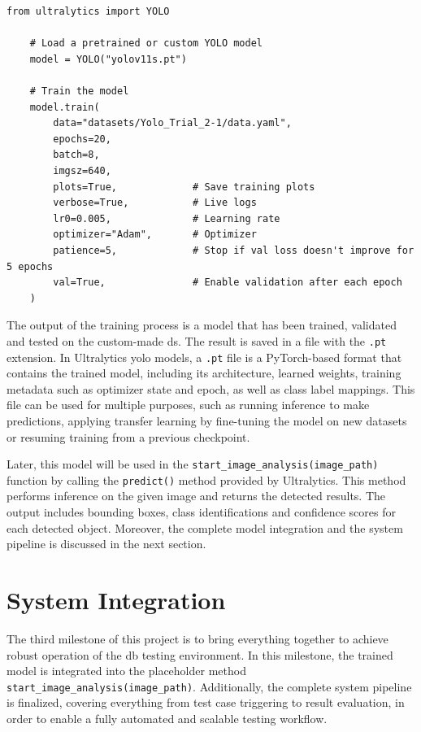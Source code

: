 \begin{lstlisting}[caption={Y\gls{yolo}v11 training code snippet}, label={lst:yolo_train}]
    from ultralytics import YOLO
    
    # Load a pretrained or custom YOLO model
    model = YOLO("yolov11s.pt") 
    
    # Train the model
    model.train(
        data="datasets/Yolo_Trial_2-1/data.yaml",
        epochs=20,
        batch=8,
        imgsz=640,
        plots=True,             # Save training plots
        verbose=True,           # Live logs
        lr0=0.005,              # Learning rate
        optimizer="Adam",       # Optimizer
        patience=5,             # Stop if val loss doesn't improve for 5 epochs
        val=True,               # Enable validation after each epoch
    )
\end{lstlisting}

The output of the training process is a model that has been trained, validated and tested on the custom-made \gls{ds}. The result is saved in a file with the \texttt{.pt} extension. In Ultralytics \gls{yolo} models, a \texttt{.pt} file is a PyTorch-based format that contains the trained model, including its architecture, learned weights, training metadata such as optimizer state and epoch, as well as class label mappings. This file can be used for multiple purposes, such as running inference to make predictions, applying transfer learning by fine-tuning the model on new datasets or resuming training from a previous checkpoint.

Later, this model will be used in the \texttt{start\_image\_analysis(image\_path)} function by calling the \texttt{predict()} method provided by Ultralytics. This method performs inference on the given image and returns the detected results. The output includes bounding boxes, class identifications and confidence scores for each detected object. Moreover, the complete model integration and the system pipeline is discussed in the next section.

\section{System Integration}
The third milestone of this project is to bring everything together to achieve robust operation of the \gls{db} testing environment. In this milestone, the trained model is integrated into the placeholder method \texttt{start\_image\_analysis(image\_path)}. Additionally, the complete system pipeline is finalized, covering everything from test case triggering to result evaluation, in order to enable a fully automated and scalable testing workflow.

